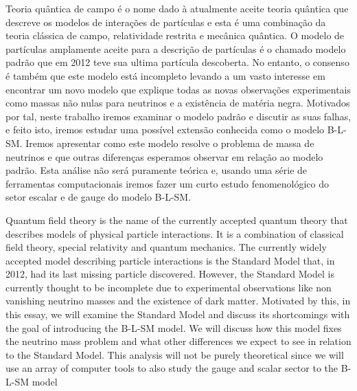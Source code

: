 \documentclass[12pt]{article}
\begin{document}
\TitlePage
  \vspace*{55mm}
       {Teoria quântica de campo é o nome dado à atualmente aceite teoria quântica que descreve os modelos de interações de partículas e esta é uma combinação da teoria clássica de campo, relatividade restrita e mecânica quântica. O modelo de partículas amplamente aceite para a descrição de partículas é o chamado modelo padrão que em 2012 teve sua ultima partícula descoberta. No entanto, o consenso é também que este modelo está incompleto levando a um vasto interesse em encontrar um novo modelo que explique todas as novas observações experimentais como massas não nulas para neutrinos e a existência de matéria negra.     Motivados por tal,  neste trabalho iremos examinar o modelo padrão e discutir as suas falhas, e feito isto, iremos estudar uma possível extensão conhecida como o modelo B-L-SM. Iremos apresentar como este modelo resolve o problema de massa de neutrinos e que outras diferenças esperamos observar em relação ao modelo padrão. Esta análise não será puramente teórica e, usando uma série de ferramentas computacionais iremos fazer um curto estudo fenomenológico do setor escalar e de gauge do modelo B-L-SM. } 
  \TEXT{}
       {}
\EndTitlePage
\titlepage\ \endtitlepage %

\TitlePage
  \vspace*{55mm}
       {Quantum field theory is the name of the currently accepted quantum theory that describes models of physical particle interactions. It is a combination of classical field theory, special relativity and quantum mechanics. The currently widely accepted model describing particle interactions is the Standard Model that, in 2012, had its last missing particle discovered. However, the Standard Model is currently thought to be incomplete due to experimental observations like non vanishing neutrino masses and the existence of dark matter. Motivated by this, in this essay, we will examine the Standard Model and discuss its shortcomings with the goal of introducing the B-L-SM model. We will discuss how this model fixes the neutrino mass problem and what other differences we expect to see in relation to the Standard Model. This analysis will not be purely theoretical since we will use an array of computer tools to also study the gauge and scalar sector to the B-L-SM model  }
\EndTitlePage
\titlepage\ \endtitlepage %


\tableofcontents
\end{document}

